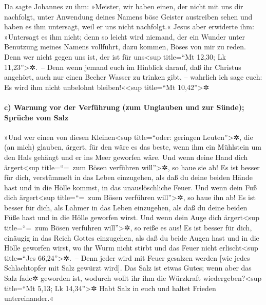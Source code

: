  Da sagte Johannes zu ihm: »Meister, wir haben einen, der
nicht mit uns dir nachfolgt, unter Anwendung deines Namens böse Geister
austreiben sehen und haben es ihm untersagt, weil er uns nicht
nachfolgt.«  Jesus aber erwiderte ihm: »Untersagt es ihm
nicht; denn so leicht wird niemand, der ein Wunder unter Benutzung
meines Namens vollführt, dazu kommen, Böses von mir zu reden.
 Denn wer nicht gegen uns ist, der ist für
uns\textless sup title=``Mt 12,30; Lk 11,23''\textgreater✲.~--
 Denn wenn jemand euch im Hinblick darauf, daß ihr
Christus angehört, auch nur einen Becher Wasser zu trinken gibt, --
wahrlich ich sage euch: Es wird ihm nicht unbelohnt
bleiben!«\textless sup title=``Mt 10,42''\textgreater✲

\hypertarget{c-warnung-vor-der-verfuxfchrung-zum-unglauben-und-zur-suxfcnde-spruxfcche-vom-salz}{%
\paragraph{c) Warnung vor der Verführung (zum Unglauben und zur Sünde);
Sprüche vom
Salz}\label{c-warnung-vor-der-verfuxfchrung-zum-unglauben-und-zur-suxfcnde-spruxfcche-vom-salz}}

 »Und wer einen von diesen Kleinen\textless sup
title=``oder: geringen Leuten''\textgreater✲, die (an mich) glauben,
ärgert, für den wäre es das beste, wenn ihm ein Mühlstein um den Hals
gehängt und er ins Meer geworfen wäre.  Und wenn deine
Hand dich ärgert\textless sup title=``=~zum Bösen verführen
will''\textgreater✲, so haue sie ab! Es ist besser für dich, verstümmelt
in das Leben einzugehen, als daß du deine beiden Hände hast und in die
Hölle kommst, in das unauslöschliche Feuer. 
 Und wenn dein Fuß dich ärgert\textless sup title=``=~zum
Bösen verführen will''\textgreater✲, so haue ihn ab! Es ist besser für
dich, als Lahmer in das Leben einzugehen, als daß du deine beiden Füße
hast und in die Hölle geworfen wirst.  
Und wenn dein Auge dich ärgert\textless sup title=``=~zum Bösen
verführen will''\textgreater✲, so reiße es aus! Es ist besser für dich,
einäugig in das Reich Gottes einzugehen, als daß du beide Augen hast und
in die Hölle geworfen wirst,  wo ihr Wurm nicht stirbt
und das Feuer nicht erlischt\textless sup title=``Jes
66,24''\textgreater✲.~--  Denn jeder wird mit Feuer
gesalzen werden {[}wie jedes Schlachtopfer mit Salz gewürzt wird{]}.
 Das Salz ist etwas Gutes; wenn aber das Salz fade✲
geworden ist, wodurch wollt ihr ihm die Würzkraft
wiedergeben?\textless sup title=``Mt 5,13; Lk 14,34''\textgreater✲ Habt
Salz in euch und haltet Frieden untereinander.«

